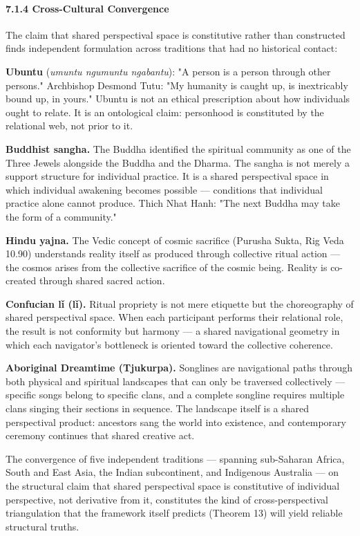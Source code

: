 \paragraph*{7.1.4 Cross-Cultural Convergence}


The claim that shared perspectival space is constitutive rather than constructed finds independent formulation across traditions that had no historical contact:


\textbf{Ubuntu} (\textit{umuntu ngumuntu ngabantu}): "A person is a person through other persons." Archbishop Desmond Tutu: "My humanity is caught up, is inextricably bound up, in yours." Ubuntu is not an ethical prescription about how individuals ought to relate. It is an ontological claim: personhood is constituted by the relational web, not prior to it.


\textbf{Buddhist sangha.} The Buddha identified the spiritual community as one of the Three Jewels alongside the Buddha and the Dharma. The sangha is not merely a support structure for individual practice. It is a shared perspectival space in which individual awakening becomes possible — conditions that individual practice alone cannot produce. Thich Nhat Hanh: "The next Buddha may take the form of a community."


\textbf{Hindu yajna.} The Vedic concept of cosmic sacrifice (Purusha Sukta, Rig Veda 10.90) understands reality itself as produced through collective ritual action — the cosmos arises from the collective sacrifice of the cosmic being. Reality is co-created through shared sacred action.


\textbf{Confucian l\v{i} ({l\v{i}}).} Ritual propriety is not mere etiquette but the choreography of shared perspectival space. When each participant performs their relational role, the result is not conformity but harmony — a shared navigational geometry in which each navigator's bottleneck is oriented toward the collective coherence.


\textbf{Aboriginal Dreamtime (Tjukurpa).} Songlines are navigational paths through both physical and spiritual landscapes that can only be traversed collectively — specific songs belong to specific clans, and a complete songline requires multiple clans singing their sections in sequence. The landscape itself is a shared perspectival product: ancestors sang the world into existence, and contemporary ceremony continues that shared creative act.


The convergence of five independent traditions — spanning sub-Saharan Africa, South and East Asia, the Indian subcontinent, and Indigenous Australia — on the structural claim that shared perspectival space is constitutive of individual perspective, not derivative from it, constitutes the kind of cross-perspectival triangulation that the framework itself predicts (Theorem 13) will yield reliable structural truths.



